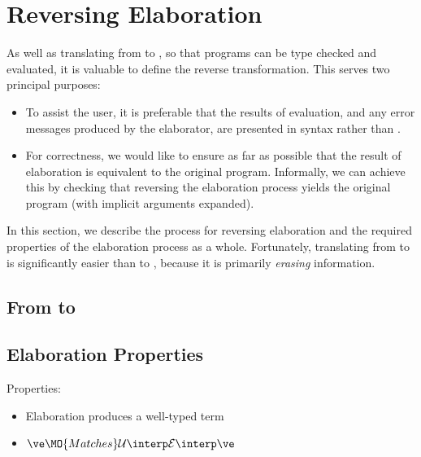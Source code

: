 \section{Reversing Elaboration}

\label{sect:delab}

As well as translating from \Idris{} to \TT{}, so that programs can be type
checked and evaluated, it is valuable to define the reverse transformation. This
serves two principal purposes:

\begin{itemize}
\item To assist the user, it is preferable that the results of evaluation, and any
error messages produced by the elaborator, are presented in \Idris{} syntax
rather than \TT{}.
\item For correctness, we would like to ensure as far as possible that the 
result of elaboration is equivalent to the original program. Informally, we can
achieve this by checking that reversing the elaboration process yields the original
program (with implicit arguments expanded).
\end{itemize}

\noindent
In this section, we describe the process for reversing elaboration and the required
properties of the elaboration process as a whole. Fortunately, translating from
\TT{} to \Idris{} is significantly easier than \Idris{} to \TT{}, because it is
primarily \emph{erasing} information.

\subsection{From \TT{} to \Idris{}}

\subsection{Elaboration Properties}


Properties:
\begin{itemize}
\item Elaboration produces a well-typed term
\item $\ve \MO{Matches} \uninterp{\ttinterp{\ve}}$
\end{itemize}


